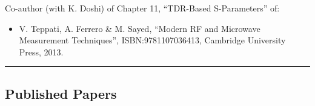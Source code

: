 \documentclass[10pt,letterpaper]{extarticle}
\begin{document}
\begin{flushleft} 
Co-author (with K. Doshi) of Chapter 11, “TDR-Based S-Parameters” of:
\end{flushleft}
\vspace{-1.5 em}
\begin{itemize}
\parskip=-0.2em
\item V. Teppati, A. Ferrero \& M. Sayed, “Modern RF and Microwave Measurement Techniques”, ISBN:9781107036413, Cambridge University Press, 2013.
\end{itemize}

\vspace{0.2em}
\hrule
\vspace{-1em}\subsection*{\Large Published Papers}\vspace{-0.5em}
\end{document}
